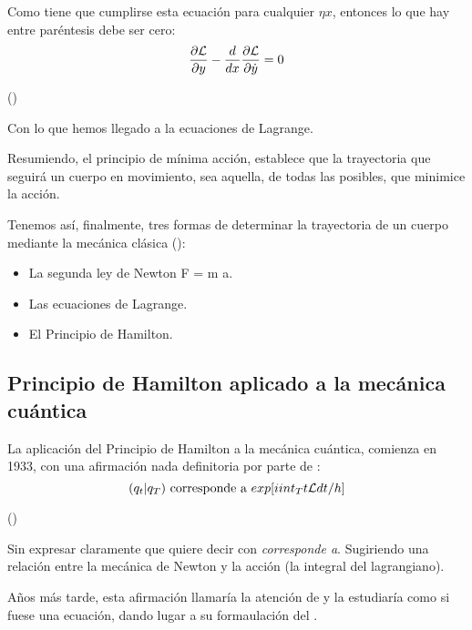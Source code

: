 Como tiene que cumplirse esta ecuación para cualquier $\eta{x}$, entonces lo que hay entre paréntesis debe ser cero:
\begin{equation}
    \frac{\partial\mathcal{L}}{\partial y} - \frac{d}{dx}\frac{\partial\mathcal{L}}{\partial\dot{y}} = 0
\end{equation}

(\cite{Taylor})

Con lo que hemos llegado a la ecuaciones de Lagrange.

Resumiendo, el principio de mínima acción, establece que la trayectoria que seguirá un cuerpo en movimiento, sea aquella, de todas las posibles, que minimice la acción.

Tenemos así, finalmente, tres formas de determinar la trayectoria de un cuerpo mediante la mecánica clásica (\cite[264]{Taylor}):
\begin{itemize}
    \item La segunda ley de Newton F = m \cdot a.
    \item Las ecuaciones de Lagrange.
    \item El Principio de Hamilton.
\end{itemize}

\subsection{Principio de Hamilton aplicado a la mecánica cuántica}
La aplicación del Principio de Hamilton a la mecánica cuántica, comienza en 1933, con una afirmación nada definitoria por parte de :
\begin{equation}
    (q_t|q_T)\text{ corresponde a }exp[i int_{T}{t}\mathcal{L} dt/h] 
\end{equation}

(\cite{DiracLagrangian})

Sin expresar claramente que quiere decir con \textit{corresponde a}. Sugiriendo una relación entre la mecánica de Newton y la acción (la integral del lagrangiano).

Años más tarde, esta afirmación llamaría la atención de  y la estudiaría como si fuese una ecuación, dando lugar a su formaulación del .
